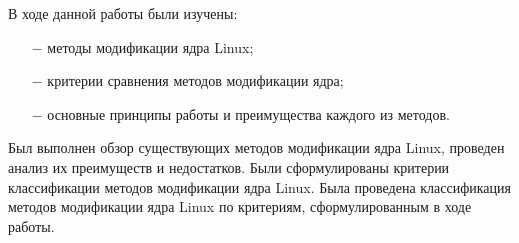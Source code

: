 
В ходе данной работы были изучены:
\begin{itemize}
    \item[$-$] методы модификации ядра Linux;
    \item[$-$] критерии сравнения методов модификации ядра;
    \item[$-$] основные принципы работы и преимущества каждого из методов.
\end{itemize}
Был выполнен обзор существующих методов модификации ядра Linux, проведен анализ их преимуществ и недостатков.
Были сформулированы критерии классификации методов модификации ядра Linux.
Была проведена классификация методов модификации ядра Linux по критериям, сформулированным в ходе работы.
